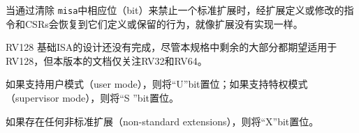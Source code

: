 当通过清除 {\tt misa}中相应位（bit）来禁止一个标准扩展时，经扩展定义或修改的指令和CSRs会恢复到它们定义或保留的行为，就像扩展没有实现一样。

\iffalse
The design of the RV128I base ISA is not yet complete, and while much of the remainder of this
specification is expected to apply to RV128, this version of the document
focuses only on RV32 and RV64.
\fi

RV128 基础ISA的设计还没有完成，尽管本规格中剩余的大部分都期望适用于RV128，但本版本的文档仅关注RV32和RV64。

\iffalse
The ``U'' and ``S'' bits will be set if there is support for user and
supervisor modes respectively.

The ``X'' bit will be set if there are any non-standard extensions.
\fi

如果支持用户模式（user mode），则将“U”bit置位；如果支持特权模式（supervisor mode），则将“S ”bit置位。

如果存在任何非标准扩展（non-standard extensions），则将“X”bit置位。

